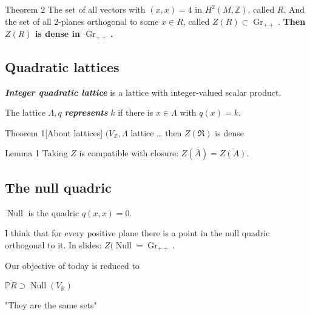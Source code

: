\begin{idea5}{Theorem 2}\leavevmode
	The set of all vectors with $(x,x)=4$ in  $H^{2}(M,\mathbb{Z})$, called $R$. And the set of all 2-planes orthogonal to some $x\in R$, called $Z(R)\subset \operatorname{Gr}_{++}$. \textbf{Then $Z(R)$ is dense in  $\operatorname{Gr}_{++}$.} 
\end{idea5}

\subsection{Quadratic lattices}

\begin{defn}\leavevmode
	\textit{\textbf{Integer quadratic lattice}} is a lattice with integer-valued scalar product.

	The lattice  $\Lambda,q$ \textit{\textbf{represents}}  $k$ if there is $x\in\Lambda$ with $q(x)=k$.
\end{defn}

\begin{idea3}{Theorem 1}[About lattices]\leavevmode
	$(V_{\mathbb{Z}},\Lambda$ lattice … then $Z(\mathfrak{R})$ is dense
\end{idea3}

\begin{idea4}{Lemma 1}\leavevmode
	Taking $Z$ is compatible with closure: $Z(\bar{A})=\overline{Z(A)}$.
\end{idea4}

\subsection{The null quadric}
\begin{defn}\leavevmode
	$\operatorname{Null}$ is the quadric $q(x,x)=0$.
\end{defn}

\begin{remark}\leavevmode
	I think that for every positive plane there is a point in the null quadric orthogonal to it. In slides: $Z(\operatorname{Nu ll}=\operatorname{Gr}_{++}$.
\end{remark}

Our objective of today is reduced to

\begin{thm}[3]\leavevmode
	$\overline{\mathbb{P}R}\supset \operatorname{Nu ll}(V_{\mathbb{R}})$
\end{thm}

\begin{remark}\leavevmode
	"They are the same sets"
\end{remark}

